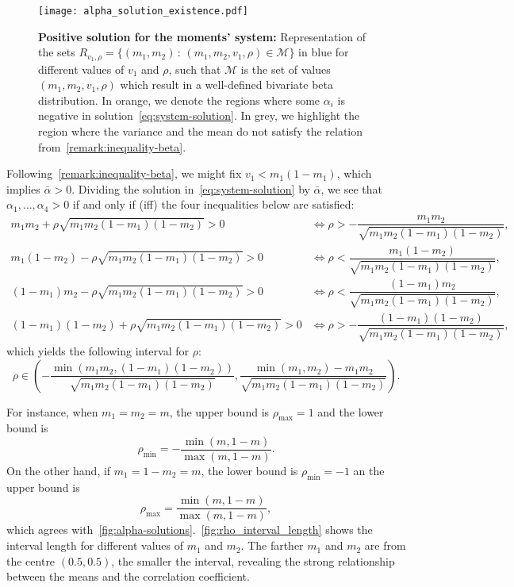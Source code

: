 \documentclass[a4paper, notitlepage, 10pt]{article}
\theoremstyle{definition}
\begin{document}
\begin{figure}[!htbp]
    \centering
    \texttt{[image: alpha\_solution\_existence.pdf]}
    \caption{{\bf Positive solution for the moments' system:} 
    Representation of the sets $R_{v_1, \rho} = \{(m_1, m_2) \,:\, (m_1, m_2, v_1, \rho) \in \mathcal{M} \}$ in blue for different values of $v_1$ and $\rho$, such that $\mathcal{M}$ is the set of values $(m_1, m_2, v_1, \rho)$ which result in a well-defined bivariate beta distribution.
    In orange, we denote the regions where some $\alpha_i$ is negative in solution~\eqref{eq:system-solution}. 
    In grey, we highlight the region where the variance and the mean do not satisfy the relation from~\autoref{remark:inequality-beta}.
    }\label{fig:alpha-solutions}
\end{figure}

Following~\autoref{remark:inequality-beta}, we might fix $v_1 < m_1(1-m_1)$, which implies $\bar{\alpha} > 0$.
Dividing the solution in~\eqref{eq:system-solution} by $\bar{\alpha}$, we see that $\alpha_1, \dots, \alpha_4 > 0$ if and only if (iff) the four inequalities below are satisfied:
\begin{align*}
    m_1m_2 + \rho\sqrt{m_1m_2(1-m_1)(1-m_2)} > 0 &\iff \rho > -\dfrac{m_1m_2}{\sqrt{m_1m_2(1-m_1)(1-m_2)}},\\[1ex]
    m_1(1 - m_2) - \rho\sqrt{m_1m_2(1-m_1)(1-m_2)} > 0 &\iff \rho < \dfrac{m_1(1-m_2)}{\sqrt{m_1m_2(1-m_1)(1-m_2)}},\\[1ex]
    (1- m_1)m_2 - \rho\sqrt{m_1m_2(1-m_1)(1-m_2)} > 0 &\iff \rho < \dfrac{(1-m_1)m_2}{\sqrt{m_1m_2(1-m_1)(1-m_2)}},\\[1ex]
    (1-m_1)(1-m_2) + \rho\sqrt{m_1m_2(1-m_1)(1-m_2)} > 0 &\iff \rho > -\dfrac{(1-m_1)(1-m_2)}{\sqrt{m_1m_2(1-m_1)(1-m_2)}},
\end{align*}
which yields the following interval for $\rho$:
\begin{equation}
    \label{eq:interval-rho}
    \rho \in \left(-\frac{\min(m_1m_2, (1-m_1)(1-m_2))}{\sqrt{m_1m_2(1-m_1)(1-m_2)}}, 
    \frac{\min(m_1, m_2) - m_1m_2}{\sqrt{m_1m_2(1-m_1)(1-m_2)}}\right).     
\end{equation}

For instance, when $m_1 = m_2 = m$, the upper bound is $\rho_{\max} = 1$ and the lower bound is 
\[
\rho_{\min} = -\frac{\min(m, 1-m)}{\max(m, 1-m)}.
\]
On the other hand, if $m_1 = 1 - m_2 = m$, the lower bound is $\rho_{\min} = -1$ an the upper bound is 
\[
\rho_{\max} = \frac{\min(m, 1-m)}{\max(m, 1-m)},
\]
which agrees with~\autoref{fig:alpha-solutions}.~\autoref{fig:rho_interval_length} shows the interval length for different values of $m_1$ and $m_2$.
The farther $m_1$ and $m_2$ are from the centre $(0.5, 0.5)$, the smaller the interval, revealing the strong relationship between the means and the correlation coefficient.
\end{document}
